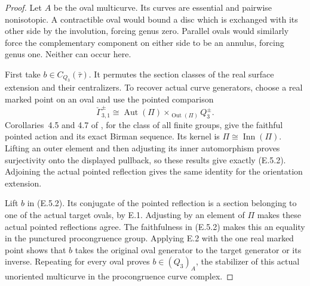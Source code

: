 \begin{proof}
Let $A$ be the oval multicurve.  Its curves are essential and
pairwise nonisotopic.  A contractible oval would bound a disc
which is exchanged with its other side by the involution,
forcing genus zero.  Parallel ovals would similarly force
the complementary component on either side to be an annulus,
forcing genus one.  Neither can occur here.

First take $b\in C_{Q_3}(\bar\tau)$.  It permutes the section
classes of the real surface extension and their centralizers.
To recover actual curve generators, choose a real marked point
on an oval and use the pointed comparison
\[
 \check\Gamma_{3,1}^{\pm}\cong
 \operatorname{Aut}(\Pi)\mathbin{\times}_{\operatorname{Out}(\Pi)}
                                      Q_3^{\pm}.             \tag{E.5.2}
\]
Corollaries~4.5 and 4.7 of \cite{CEBoggiCongruence2020}, for
the class of all finite groups, give the faithful pointed
action and its exact Birman sequence.  Its kernel is
$\Pi\cong\operatorname{Inn}(\Pi)$.  Lifting an outer element
and then adjusting its inner automorphism proves surjectivity
onto the displayed pullback, so these results give exactly
(E.5.2).  Adjoining the actual pointed reflection gives the
same identity for the orientation extension.

Lift $b$ in (E.5.2).  Its conjugate of the pointed reflection
is a section belonging to one of the actual target ovals,
by E.1.  Adjusting by an element of $\Pi$ makes these actual
pointed reflections agree.  The faithfulness in (E.5.2) makes
this an equality in the punctured procongruence group.
Applying E.2 with the one real marked point shows that $b$
takes the original oval generator to the target generator
or its inverse.  Repeating for every oval proves
$b\in(Q_3)_A$, the stabilizer of this actual unoriented
multicurve in the procongruence curve complex.


\end{proof}
